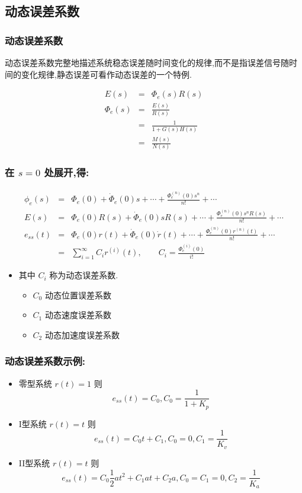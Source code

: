 \documentclass{article}
\begin{document}
\subsection{动态误差系数}
\label{sec-3-3}
\begin{frame}
\frametitle{动态误差系数}
\label{sec-3-3-1}

动态误差系数完整地描述系统稳态误差随时间变化的规律,而不是指误差信号随时间的变化规律,静态误差可看作动态误差的一个特例.

\begin{eqnarray*}
E(s) & = & \Phi_e(s)R(s)\\
\Phi_e(s) &=& \frac{E(s)}{R(s)}\\
         &=&\frac{1}{1+G(s)H(s)} \\
         &=& \frac{M(s)}{N(s)} 
\end{eqnarray*}
\end{frame}
\begin{frame}
\frametitle{在 $s=0$ 处展开,得:}
\label{sec-3-3-2}


\begin{eqnarray*}
\phi_e(s)  &=& \Phi_e(0)+\dot{\Phi}_e(0)s+\cdots+\frac{\Phi_e^{(n)}(0)s^n}{n!}+\cdots \\
E(s) & = & \Phi_e(0)R(s)+\dot{\Phi}_e(0)sR(s)+\cdots+\frac{\Phi_e^{(n)}(0)s^nR(s)}{n!}+\cdots \\
e_{ss}(t) & = & \Phi_e(0)r(t)+\dot{\Phi}_e(0)\dot{r}(t)+\cdots+\frac{\Phi_e^{(n)}(0)r^{(n)}(t)}{n!}+\cdots \\
          &= & \sum_{i=1}^{\infty}C_ir^{(i)}(t) ,\qquad
C_i = \frac{\Phi_e^{(i)}(0)}{i!}
\end{eqnarray*}

\begin{itemize}
\item 其中 $C_i$ 称为动态误差系数.
\begin{itemize}
\item $C_0$ 动态位置误差系数
\item $C_1$ 动态速度误差系数
\item $C_2$ 动态加速度误差系数
\end{itemize}
\end{itemize}
\end{frame}
\begin{frame}
\frametitle{动态误差系数示例:}
\label{sec-3-3-3}

\begin{itemize}
\item <2-> 零型系统 $r(t)=1$ 则 \[e_{ss}(t)=C_0 ,C_0=\frac{1}{1+K_p}\]
\item <3-> I型系统 $r(t)=t$ 则 \[e_{ss}(t)=C_0 t+C_1,C_0=0,C_1=\frac{1}{K_v}\]
\item <4-> II型系统 $r(t)=t$ 则 \[e_{ss}(t)=C_0 \frac{1}{2}at^2+C_1at+C_2 a,C_0=C_1=0,C_2=\frac{1}{K_a}\]
\end{itemize}
\end{frame}
\end{document}
